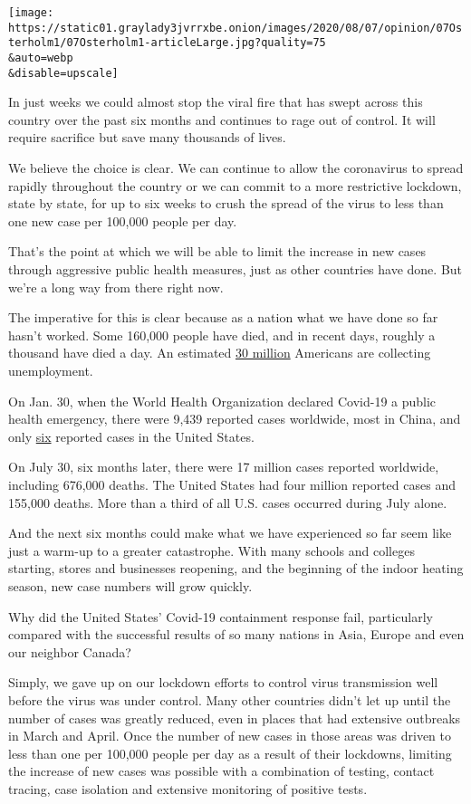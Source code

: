 \texttt{[image: https://static01.graylady3jvrrxbe.onion/images/2020/08/07/opinion/07Osterholm1/07Osterholm1-articleLarge.jpg?quality=75\\\&auto=webp\\\&disable=upscale]}

In just weeks we could almost stop the viral fire that has swept across
this country over the past six months and continues to rage out of
control. It will require sacrifice but save many thousands of lives.

We believe the choice is clear. We can continue to allow the coronavirus
to spread rapidly throughout the country or we can commit to a more
restrictive lockdown, state by state, for up to six weeks to crush the
spread of the virus to less than one new case per 100,000 people per
day.

That's the point at which we will be able to limit the increase in new
cases through aggressive public health measures, just as other countries
have done. But we're a long way from there right now.

The imperative for this is clear because as a nation what we have done
so far hasn't worked. Some 160,000 people have died, and in recent days,
roughly a thousand have died a day. An estimated
\href{https://www.nytimes3xbfgragh.onion/2020/08/06/business/economy/unemployment-claims.html}{30
million} Americans are collecting unemployment.

On Jan. 30, when the World Health Organization declared Covid-19 a
public health emergency, there were 9,439 reported cases worldwide, most
in China, and only
\href{https://www.cnn.com/asia/live-news/coronavirus-outbreak-01-30-20-intl-hnk/h_4263dd94af73bd404b425b133637a0e7}{six}
reported cases in the United States.

On July 30, six months later, there were 17 million cases reported
worldwide, including 676,000 deaths. The United States had four million
reported cases and 155,000 deaths. More than a third of all U.S. cases
occurred during July alone.

And the next six months could make what we have experienced so far seem
like just a warm-up to a greater catastrophe. With many schools and
colleges starting, stores and businesses reopening, and the beginning of
the indoor heating season, new case numbers will grow quickly.

Why did the United States' Covid-19 containment response fail,
particularly compared with the successful results of so many nations in
Asia, Europe and even our neighbor Canada?

Simply, we gave up on our lockdown efforts to control virus transmission
well before the virus was under control. Many other countries didn't let
up until the number of cases was greatly reduced, even in places that
had extensive outbreaks in March and April. Once the number of new cases
in those areas was driven to less than one per 100,000 people per day as
a result of their lockdowns, limiting the increase of new cases was
possible with a combination of testing, contact tracing, case isolation
and extensive monitoring of positive tests.

